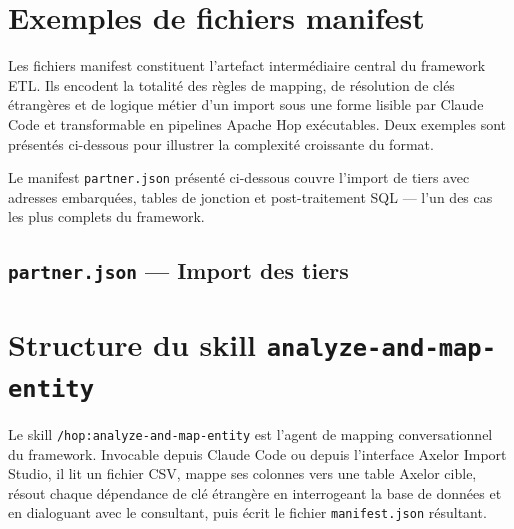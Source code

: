\chapter{Exemples de fichiers manifest}
\label{annexe:manifests}

Les fichiers manifest constituent l'artefact intermédiaire central du framework ETL.
Ils encodent la totalité des règles de mapping, de résolution de clés étrangères et de
logique métier d'un import sous une forme lisible par Claude Code et transformable en
pipelines Apache Hop exécutables. Deux exemples sont présentés ci-dessous pour illustrer
la complexité croissante du format.

Le manifest \texttt{partner.json} présenté ci-dessous couvre l'import de tiers avec
adresses embarquées, tables de jonction et post-traitement SQL — l'un des cas les plus
complets du framework.

\section{\texttt{partner.json} — Import des tiers}
\label{annexe:manifest-partner}



\chapter{Structure du skill \texttt{analyze-and-map-entity}}
\label{annexe:skill}

Le skill \texttt{/hop:analyze-and-map-entity} est l'agent de mapping conversationnel du
framework. Invocable depuis Claude Code ou depuis l'interface Axelor Import Studio, il
lit un fichier CSV, mappe ses colonnes vers une table Axelor cible, résout chaque
dépendance de clé étrangère en interrogeant la base de données et en dialoguant avec
le consultant, puis écrit le fichier \texttt{manifest.json} résultant.

